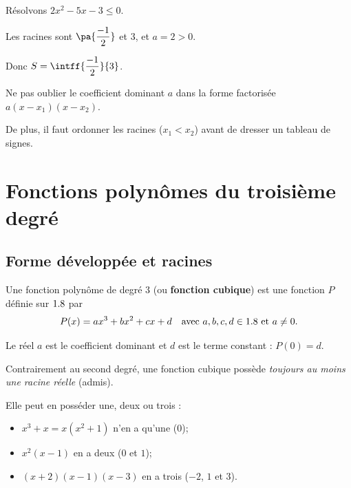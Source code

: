 \begin{ex}
	Résolvons $2x^2 - 5x - 3 \leq 0$.

	Les racines sont $\pa{\dfrac{-1}{2}}$ et $3$, et $a = 2 > 0$.
	\begin{center}
	\end{center}

	Donc $S = \intff{\dfrac{-1}{2}}{3}$.
\end{ex}

\begin{attention}
	Ne pas oublier le coefficient dominant $a$ dans la forme factorisée $a(x - x_1)(x - x_2)$.

	De plus, il faut ordonner les racines ($x_1 < x_2$) avant de dresser un tableau de signes.
\end{attention}

\section{Fonctions polynômes du troisième degré}

\subsection{Forme développée et racines}

\begin{defin}
	Une fonction polynôme de degré $3$ (ou \textbf{fonction cubique}) est une fonction $P$ définie sur $1.8$ par
	\[
		P(x) = ax^3 + bx^2 + cx + d \quad \text{avec } a, b, c, d \in 1.8 \text{ et } a \neq 0.
	\]

	Le réel $a$ est le coefficient dominant et $d$ est le terme constant : $P(0) = d$.
\end{defin}

\begin{rem}
	Contrairement au second degré, une fonction cubique possède \emph{toujours au moins une racine réelle} (admis).

	Elle peut en posséder une, deux ou trois :
	\begin{itemize}
		\item $x^3 + x = x(x^2 + 1)$ n'en a qu'une ($0$);
		\item $x^2(x-1)$ en a deux ($0$ et $1$);
		\item $(x+2)(x-1)(x-3)$ en a trois ($-2$, $1$ et $3$).
	\end{itemize}
\end{rem}

